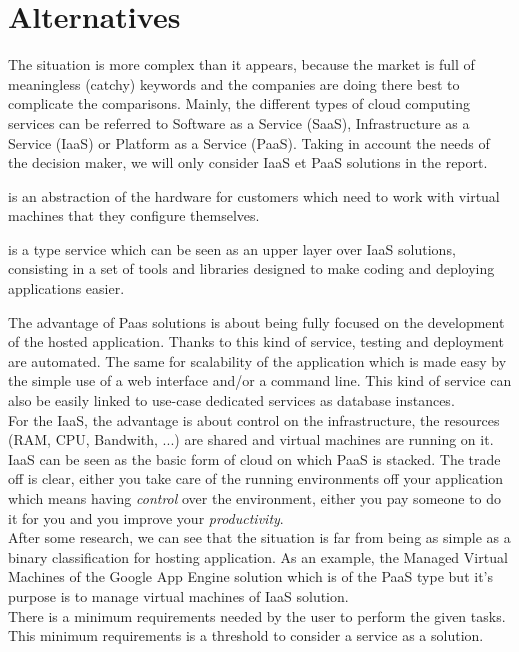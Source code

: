 \documentclass[a4paper,11pt]{article}
\begin{document}
  \section{Alternatives}
The situation is more complex than it appears, because the market is full of meaningless (catchy) keywords and the companies are doing there best to complicate the comparisons. Mainly, the different types of cloud computing services can be referred to Software as a Service (SaaS), Infrastructure as a Service (IaaS) or Platform as a Service (PaaS). Taking in account the needs of the decision maker, we will only consider IaaS et PaaS solutions in the report.
\begin{description}[parsep=10pt,labelindent=\parindent]
  \item[IaaS] is an abstraction of the hardware for customers which need to work with virtual machines that they configure themselves.
  \item[PaaS] is a type service which can be seen as an upper layer over IaaS solutions, consisting in a set of tools and libraries designed to make coding and deploying applications easier.
\end{description}
The advantage of Paas solutions is about being fully focused on the development of the hosted application. Thanks to this kind of service, testing and deployment are automated. The same for scalability of the application which is made easy by the simple use of a web interface and/or a command line. This kind of service can also be easily linked to use-case dedicated services as database instances.\\
For the IaaS, the advantage is about control on the infrastructure, the resources (RAM, CPU, Bandwith, ...) are shared and virtual machines are running on it. IaaS can be seen as the basic form of cloud on which PaaS is stacked. The trade off is clear, either you take care of the running environments off your application which means having \emph{control} over the environment, either you pay someone to do it for you and you improve your \emph{productivity}.\\
After some research, we can see that the situation is far from being as simple as a binary classification for hosting application. As an example, the Managed Virtual Machines of the Google App Engine solution which is of the PaaS type but it's purpose is to manage virtual machines of IaaS solution.\\

There is a minimum requirements needed by the user to perform the given tasks. This minimum requirements is a threshold to consider a service as a solution.\\
\end{document}
